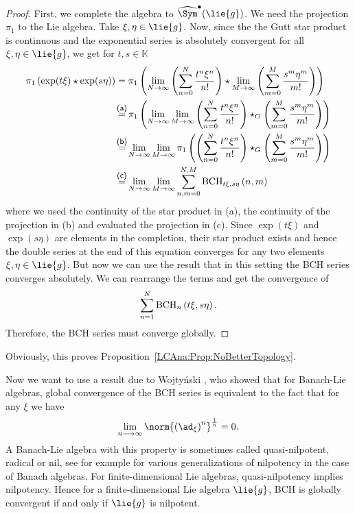 \begin{proof}
	First, we complete the algebra to $\widehat{\Sym}^{\bullet}(\lie{g})$.
	We need the projection $\pi_1$ to the Lie algebra. Take 
	$\xi, \eta \in 	\lie{g}$. Now, since the the Gutt star product is 
	continuous and the exponential series is absolutely convergent for 
	all $\xi, \eta \in \lie{g}$, we get for $t, s \in \mathbb{K}$
	\begin{align*}
		\pi_1 \left( \exp(t \xi) \star \exp(s \eta) \right)
		& =
		\pi_1
		\left(
			\lim_{N \rightarrow \infty}
			\left(
				\sum\limits_{n=0}^N
				\frac{t^n \xi^n}{n!}
			\right)
			\star
			\lim_{M \rightarrow \infty}
			\left(
				\sum\limits_{m=0}^M
				\frac{s^m \eta^m}{m!}
			\right)
		\right)
		\\
		& \ot{(a)}{=}
		\pi_1
		\left(
			\lim_{N \rightarrow \infty}
			\lim_{M \rightarrow \infty}
			\left(
				\sum\limits_{n=0}^N
				\frac{t^n \xi^n}{n!}
			\right)
			\star_G
			\left(
				\sum\limits_{m=0}^M
				\frac{s^m \eta^m}{m!}
			\right)
		\right)
		\\
		& \ot{(b)}{=}
		\lim_{N \rightarrow \infty}
		\lim_{M \rightarrow \infty}
		\pi_1
		\left(	
			\left(
				\sum\limits_{n=0}^N
				\frac{t^n \xi^n}{n!}
			\right)
			\star_G
			\left(
				\sum\limits_{m=0}^M
				\frac{s^m \eta^m}{m!}
			\right)
		\right)
		\\
		& \ot{(c)}{=}
		\lim_{N \rightarrow \infty}
		\lim_{M \rightarrow \infty}
		\sum\limits_{n,m=0}^{N, M}
		\bchparts{t \xi}{s \eta}{n}{m}
	\end{align*}
	where we used the continuity of the star product in (a), the continuity of 
	the projection in (b) and evaluated the projection in (c). Since 
	$\exp(t \xi)$ and $\exp(s \eta)$ are elements in the completion, their 
	star product exists and hence the double series at the end of this 
	equation converges for any two elements $\xi, \eta \in \lie{g}$. But now 
	we can use the result that in this setting the BCH series converges 
	absolutely. We can rearrange the terms and get the convergence of
	\begin{equation*}
		\sum\limits_{n = 1}^N
		\mathrm{BCH}_{n}\left(t \xi, s \eta\right).
	\end{equation*}
	Therefore, the BCH series must converge globally.
\end{proof}
Obviously, this proves Proposition~\ref{LCAna:Prop:NoBetterTopology}.


Now we want to use a result due to Wojty\'nski \cite{wojtynski:1998a}, who 
showed that for Banach-Lie algebras, global convergence of the BCH series is 
equivalent to the fact that for any $\xi$ we have
\begin{equation*}
	\lim_{n \longrightarrow \infty}
	\norm{ 
		\left( \ad_{\xi} \right)^n 
	}^{\frac{1}{n}}
	=
	0.
\end{equation*}
A Banach-Lie algebra with this property is sometimes called quasi-nilpotent, 
radical or nil, see for example \cite{mueller:1994a} for various 
generalizations of nilpotency in the case of Banach algebras.
For finite-dimensional Lie algebras, quasi-nilpotency implies nilpotency. 
Hence for a finite-dimensional Lie algebra $\lie{g}$, BCH is globally 
convergent if and only if $\lie{g}$ is nilpotent.


